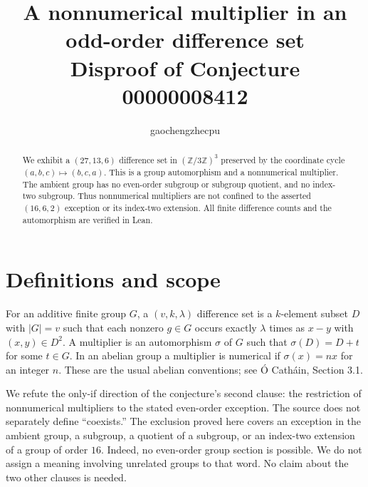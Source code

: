 \documentclass[11pt]{article}
\title{A nonnumerical multiplier in an odd-order difference set\\
\large Disproof of Conjecture 00000008412}
\author{gaochengzhecpu}\date{}
\newcommand{\Z}{\mathbb Z}
\begin{document}
\maketitle
\begin{abstract}
We exhibit a $(27,13,6)$ difference set in $(\Z/3\Z)^3$ preserved by
the coordinate cycle $(a,b,c)\mapsto(b,c,a)$. This is a group
automorphism and a nonnumerical multiplier. The ambient group has
no even-order subgroup or subgroup quotient, and no index-two
subgroup. Thus nonnumerical multipliers are not confined to the
asserted $(16,6,2)$ exception or its index-two extension.
All finite difference counts and the automorphism are verified in Lean.
\end{abstract}

\section*{Definitions and scope}
For an additive finite group $G$, a $(v,k,\lambda)$ difference set
is a $k$-element subset $D$ with $|G|=v$ such that each nonzero
$g\in G$ occurs exactly $\lambda$ times as $x-y$ with $(x,y)\in D^2$.
A multiplier is an automorphism $\sigma$ of $G$ such that
$\sigma(D)=D+t$ for some $t\in G$. In an abelian group a multiplier
is numerical if $\sigma(x)=nx$ for an integer $n$. These are the
usual abelian conventions; see \'{O} Cath\'{a}in, Section 3.1.

We refute the only-if direction of the conjecture's second clause:
the restriction of nonnumerical multipliers to the stated even-order
exception. The source does not separately define ``coexists.''
The exclusion proved here covers an exception in the ambient group,
a subgroup, a quotient of a subgroup, or an index-two extension
of a group of order $16$. Indeed, no even-order group section is
possible. We do not assign a meaning involving unrelated groups to
that word. No claim about the two other clauses is needed.
\end{document}
